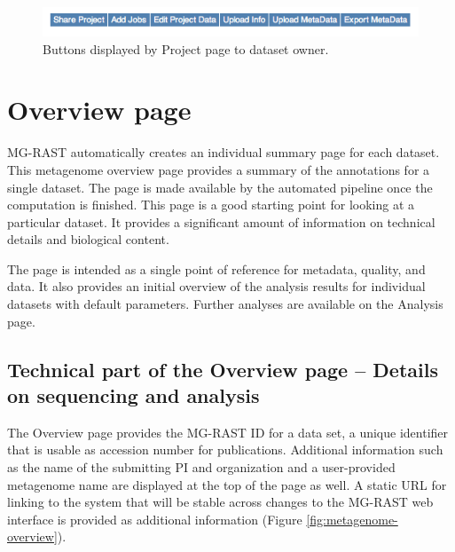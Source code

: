 \documentclass[12pt,fullpage]{report}
\begin{document}
\begin{figure}
\begin{center}
\includegraphics[width=6in]{Images/project-page-editing-buttons.png}
\end{center}
\caption{
Buttons displayed by Project page to
dataset owner.}
\label{fig:project-page-editing-buttons}
\end{figure}
\section{Overview page}

MG-RAST automatically creates an individual summary page for each dataset. This metagenome overview page provides a summary of the annotations for a single dataset. The page is made available by the automated pipeline once the computation is finished.
This page is a good starting point for looking at a particular dataset. It provides a significant amount of information on technical details and biological content.

The page is intended as a single point of reference for metadata, quality, and data. It also provides an initial overview of the analysis results for individual datasets with default parameters. Further analyses are available on the Analysis page.
\subsection{Technical part of the Overview page -- Details on sequencing and analysis}

The Overview page provides the MG-RAST ID for a data set, a unique identifier that is usable as accession number for publications. Additional information such as the name of the submitting PI and organization and a user-provided metagenome name are displayed at the top of the page as well. A static URL for linking to the system that will be stable across changes to the MG-RAST web interface is provided as additional information
(Figure \ref{fig:metagenome-overview}).
\end{document}
